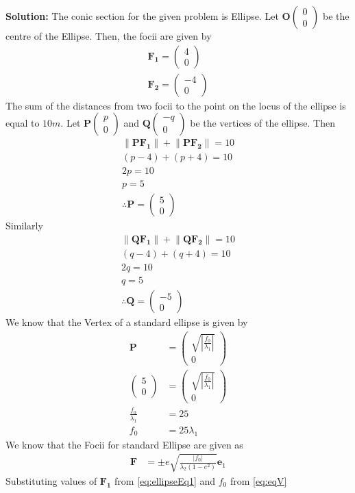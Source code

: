 \documentclass[12pt]{article}
\providecommand{\brak}[1]{\ensuremath{\left(#1\right)}}
\providecommand{\norm}[1]{\left\lVert#1\right\rVert}
\providecommand{\abs}[1]{\left\vert#1\right\vert}
\newcommand{\solution}{\noindent \textbf{Solution: }}
\newcommand{\myvec}[1]{\ensuremath{\begin{pmatrix}#1\end{pmatrix}}}
\let\vec\mathbf
\begin{document}
\begin{enumerate}
\solution 
The conic section for the given problem is Ellipse. Let $\vec{O}\myvec{0 \\ 0}$ be the centre of the Ellipse. Then, the focii are given by 
\begin{align}
    \label{eq:ellipseEq1}
	\vec{F_1} = \myvec{ 4 \\ 0} \\
	\vec{F_2} = \myvec{ -4 \\ 0} 
\end{align}
The sum of the distances from two focii to the point on the locus of the ellipse is equal to $10m$. Let $\vec{P}\myvec{p \\ 0 }$ and $\vec{Q}\myvec{-q \\ 0}$ be the vertices of the ellipse. Then
\begin{align}
	\norm{\vec{P}\vec{F_1}} + \norm{\vec{P}\vec{F_2}} = 10 \\
         \brak{p-4} + \brak{p+4} = 10 \\
	 2p = 10 \\
	 p = 5  \\
	 \therefore \vec{P} = \myvec{5 \\ 0}
\end{align}
Similarly
\begin{align}
	\norm{\vec{Q}\vec{F_1}} + \norm{\vec{Q}\vec{F_2}} = 10 \\
         \brak{q-4} + \brak{q+4} = 10 \\
	 2q = 10 \\
	 q = 5 \\
	 \therefore \vec{Q} = \myvec{-5 \\ 0}
\end{align}
We know that the Vertex of a standard ellipse is given by
\begin{align}
	\vec{P} &=  \myvec{\sqrt{\abs{\frac{f_0}{\lambda_1}}} \\ 0} \\
	\myvec{5 \\ 0} &=  \myvec{\sqrt{\abs{\frac{f_0}{\lambda_1}}} \\ 0} \\
	\frac{f_0}{\lambda_1} &= 25 \\
	\label{eq:eqV}
	f_0 &= 25\lambda_1 
\end{align}
We know that the Focii for standard Ellipse are given as
\begin{align}
	\label{eq:eqV1}
	\vec{F} &= \pm e\sqrt{\frac{\abs{f_0}}{\lambda_2\brak{1-e^2}}}\vec{e}_1
\end{align}
Substituting values of $\vec{F_1}$ from \eqref{eq:ellipseEq1} and $f_0$ from \eqref{eq:eqV}

\end{enumerate}
\end{document}
